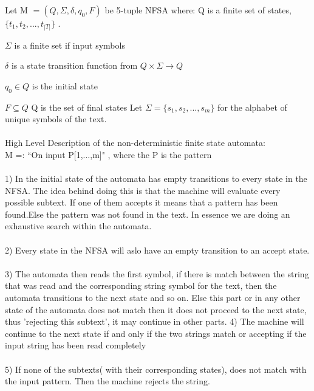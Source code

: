 \documentclass{report}
\newcommand{\me}[1]{
\begin{math}
#1
\end{math}
}
\begin{document}
Let M \me{=(Q,\Sigma,\delta,q_0,F)} be 5-tuple NFSA where: \newline
Q is a finite set of states,\me {\{t_1,t_2,...,t_{|T|}\}}. \newline
\me{\Sigma} is a finite set if input symbols \newline
\me{\delta} is a state transition function from \me{Q \times \Sigma \rightarrow Q} \newline
\me{q_0 \in Q} is the initial state \newline
\me{F \subseteq Q} Q is the set of final states \newline
Let \me{\Sigma=\{s_1,s_2,...,s_{m}\}} for the alphabet of unique symbols of the text. \newline
\\
\\
High Level Description of the non-deterministic finite state automata: \\
M =: ``On input P[1,...,m]" , where the P is the pattern\\ \\
1) In the initial state of the automata has empty transitions to every state in the NFSA. The idea behind doing this is that the machine will evaluate every possible subtext. If one of them accepts it means that a pattern has been found.Else the pattern was not found in the text. In essence we are doing an exhaustive search within the automata. \\ \\
2) Every state in the NFSA will aslo have an empty transition to an accept state. \\ \\

3) The automata then reads the first symbol, if there is match between the string that was read and the corresponding string symbol for the text, then the automata transitions to the next state and so on. Else this part or in any other state of the automata does not match then it does not proceed to the next state, thus 'rejecting this subtext', it may continue in other parts.
4) The machine will continue to the next state if and only if  the two strings match or accepting if the input string has been read completely\\ \\

5) If none of the subtexts( with their corresponding states), does not match with the input pattern. Then the machine rejects the string.\\\\
\end{document}
